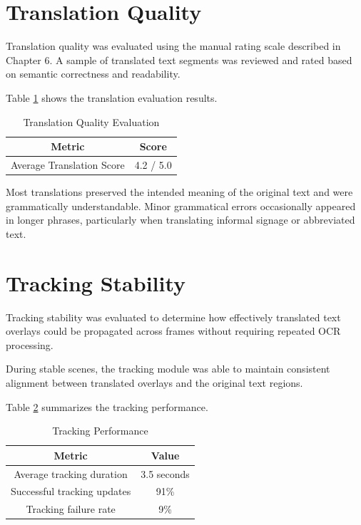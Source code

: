 \section{Translation Quality}

Translation quality was evaluated using the manual rating scale described in Chapter 6. A sample of translated text segments was reviewed and rated based on semantic correctness and readability.

Table \ref{tab:translation_quality} shows the translation evaluation results.

\begin{table}[h]
\centering
\caption{Translation Quality Evaluation}
\label{tab:translation_quality}
\begin{tabular}{|c|c|}
\hline
Metric & Score \\
\hline
Average Translation Score & 4.2 / 5.0 \\
\hline
\end{tabular}
\end{table}

Most translations preserved the intended meaning of the original text and were grammatically understandable. Minor grammatical errors occasionally appeared in longer phrases, particularly when translating informal signage or abbreviated text.

\section{Tracking Stability}

Tracking stability was evaluated to determine how effectively translated text overlays could be propagated across frames without requiring repeated OCR processing.

During stable scenes, the tracking module was able to maintain consistent alignment between translated overlays and the original text regions.

Table \ref{tab:tracking_results} summarizes the tracking performance.

\begin{table}[h]
\centering
\caption{Tracking Performance}
\label{tab:tracking_results}
\begin{tabular}{|c|c|}
\hline
Metric & Value \\
\hline
Average tracking duration & 3.5 seconds \\
Successful tracking updates & 91\% \\
Tracking failure rate & 9\% \\
\hline
\end{tabular}
\end{table}

